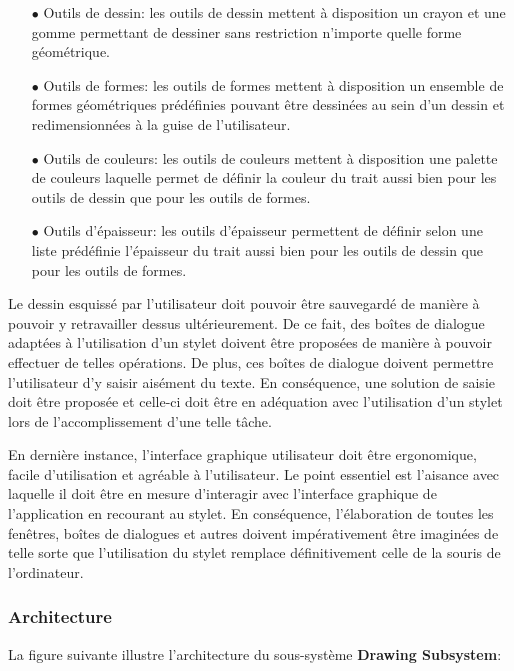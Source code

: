 \documentclass[11pt,a4paper,oldfontcommands]{memoir}
\begin{document}
\begin{itemize}
\item[$\bullet$] Outils de dessin: les outils de dessin mettent à disposition un crayon et une gomme permettant de dessiner sans restriction n'importe quelle forme géométrique.
\item[$\bullet$] Outils de formes: les outils de formes mettent à disposition un ensemble de formes géométriques prédéfinies pouvant être dessinées au sein d'un dessin et redimensionnées à la guise de l'utilisateur.
\item[$\bullet$] Outils de couleurs: les outils de couleurs mettent à disposition une palette de couleurs laquelle permet de définir la couleur du trait aussi bien pour les outils de dessin que pour les outils de formes.
\item[$\bullet$] Outils d'épaisseur: les outils d'épaisseur permettent de définir selon une liste prédéfinie l'épaisseur du trait aussi bien pour les outils de dessin que pour les outils de formes.
\end{itemize}

Le dessin esquissé par l'utilisateur doit pouvoir être sauvegardé de manière à pouvoir y retravailler dessus ultérieurement. De ce fait, des boîtes de dialogue adaptées à l'utilisation d'un stylet doivent être proposées de manière à pouvoir effectuer de telles opérations. De plus, ces boîtes de dialogue doivent permettre l'utilisateur d'y saisir aisément du texte. En conséquence, une solution de saisie doit être proposée et celle-ci doit être en adéquation avec l'utilisation d'un stylet lors de l'accomplissement d'une telle tâche.

En dernière instance, l'interface graphique utilisateur doit être ergonomique, facile d'utilisation et agréable à l'utilisateur. Le point essentiel est l'aisance avec laquelle il doit être en mesure d'interagir avec l'interface graphique de l'application en recourant au stylet. En conséquence, l'élaboration de toutes les fenêtres, boîtes de dialogues et autres doivent impérativement être imaginées de telle sorte que l'utilisation du stylet remplace définitivement celle de la souris de l'ordinateur.

\newpage

\subsubsection{Architecture}

La figure suivante illustre l'architecture du sous-système \textbf{Drawing Subsystem}:
\end{document}
